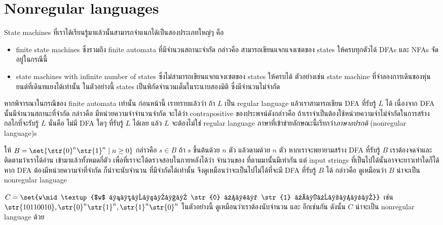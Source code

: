 \section{Nonregular languages}

State machines ที่เราได้เรียนรู้มาแล้วนั้นสามารถจำแนกได้เป็นสองประเภทใหญ่ๆ คือ
\begin{itemize}
\item finite state machines ซึ่งรวมถึง finite automata ที่มีจำนวนสถานะจำกัด กล่าวคือ สามารถเขียนแจกแจงเซตของ states ให้ครบทุกตัวได้ \enskip DFAs และ NFAs จัดอยู่ในกรณีนี้
\item state machines with infinite number of states ซึ่งไม่สามารถเขียนแจกแจงเซตของ states ให้ครบได้ ตัวอย่างเช่น state machine ที่จำลองการเดินของหุ่นยนต์ที่เดินทแยงได้เท่านั้น \enskip ในตัวอย่างนี้ states เป็นพิกัดจำนวนเต็มในระนาบสองมิติ ซึ่งมีจำนวนไม่จำกัด
\end{itemize}
หากพิจารณาในกรณีของ finite automata เท่านั้น ก่อนหน้านี้ เราทราบแล้วว่า ถ้า $L$ เป็น regular language แล้วเราสามารถเขียน DFA ที่รับรู้ $L$ ได้ \enskip เนื่องจาก DFA นั้นมีจำนวนสถานะที่จำกัด กล่าวคือ มีหน่วยความจำจำนวนจำกัด จะได้ว่า contrapositive ของประพจน์ดังกล่าวคือ ถ้าเราจำเป็นต้องใช้หน่วยความจำไม่จำกัดในการสร้างกลไกที่จะรับรู้ $L$ นั่นคือ ไม่มี DFA ใดๆ ที่รับรู้ $L$ ได้เลย แล้ว $L$ จะต้องไม่ใช่ regular language \enskip ภาษาที่เข้าข่ายลักษณะนี้เรียกว่า\emph{ภาษาอปรกติ} (nonregular language)s

\begin{example}
ให้ $B=\set{\str{0}^n\str{1}^n\mid n\geq 0}$ กล่าวคือ $s\in B$ ถ้า $s$ ขึ้นต้นด้วย  $n$ ตัว แล้วตามด้วย  $n$ ตัว \enskip หากเราจะพยายามสร้าง DFA ที่รับรู้ $B$ เราต้องจดจำและติดตามว่าเราได้อ่าน  เข้ามาแล้วทั้งหมดกี่ตัว เพื่อที่เราจะได้ตรวจสอบในภายหลังได้ว่า จำนวนของ  ที่ตามมานั้นมีเท่ากัน \enskip แต่ input strings ที่เป็นไปได้นั้นอาจจะยาวเท่าใดก็ได้ หาก DFA ต้องมีหน่วยความจำที่จำกัด ก็น่าจะนับจำนวน  ที่มีจำกัดได้เท่านั้น \enskip จึงดูเหมือนว่าจะเป็นไปไม่ได้ที่จะมี DFA ที่รับรู้ $B$ ได้ กล่าวคือ ดูเหมือนว่า $B$ น่าจะเป็น nonregular language
\end{example}

\begin{example}
$C=\set{w\mid\textup{$w$ มีจำนวน \str{0} และ \str{1} เท่ากัน}}$ \enskip เช่น $\str{10110010},\str{0}^n\str{1}^n,\str{1}^n\str{0}^n$ \enskip ในตัวอย่างนี้ ดูเหมือนว่าเราต้องนับจำนวน  และ  อีกเช่นกัน \enskip ดังนั้น $C$ น่าจะเป็น nonregular language ด้วย
\end{example}

